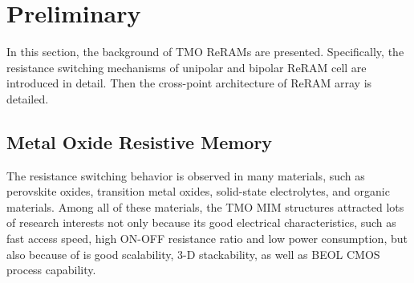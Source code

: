 \section{Preliminary} \label{sec:prel}
In this section, the background of TMO ReRAMs are presented. Specifically, the resistance switching mechanisms of unipolar and bipolar ReRAM cell are introduced in detail. Then the cross-point architecture of ReRAM array is detailed.
\subsection{Metal Oxide Resistive Memory}
The resistance switching behavior is observed in many materials, such as
perovskite oxides, transition metal oxides, solid-state electrolytes, and organic materials. Among all of these materials, the TMO MIM structures attracted lots of research interests not only because its good electrical characteristics, such as fast access speed, high ON-OFF resistance ratio and low power consumption, but also because of is good scalability, 3-D stackability, as well as BEOL CMOS process capability.

